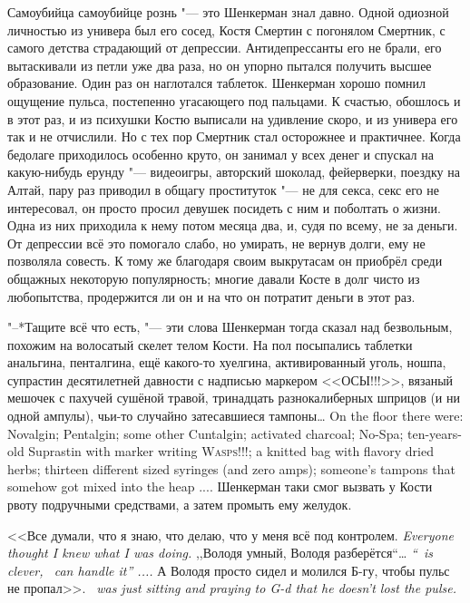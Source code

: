 Самоубийца самоубийце рознь "--- это Шенкерман знал давно.
Одной одиозной личностью из универа был его сосед, Костя Смертин с погонялом Смертник, с самого детства страдающий от депрессии.
Антидепрессанты его не брали, его вытаскивали из петли уже два раза, но он упорно пытался получить высшее образование.
Один раз он наглотался таблеток.
Шенкерман хорошо помнил ощущение пульса, постепенно угасающего под пальцами.
К счастью, обошлось и в этот раз, и из психушки Костю выписали на удивление скоро, и из универа его так и не отчислили.
Но с тех пор Смертник стал осторожнее и практичнее.
Когда бедолаге приходилось особенно круто, он занимал у всех денег и спускал на какую-нибудь ерунду "--- видеоигры, авторский шоколад, фейерверки, поездку на Алтай, пару раз приводил в общагу проституток "--- не для секса, секс его не интересовал, он просто просил девушек посидеть с ним и поболтать о жизни.
Одна из них приходила к нему потом месяца два, и, судя по всему, не за деньги.
От депрессии всё это помогало слабо, но умирать, не вернув долги, ему не позволяла совесть.
К тому же благодаря своим выкрутасам он приобрёл среди общажных некоторую популярность;
многие давали Косте в долг чисто из любопытства, продержится ли он и на что он потратит деньги в этот раз.

"--*Тащите всё что есть, "--- эти слова Шенкерман тогда сказал над безвольным, похожим на волосатый скелет телом Кости.
{На пол посыпались таблетки анальгина, пенталгина, ещё какого-то хуелгина, активированный уголь, ношпа, супрастин десятилетней давности с надписью маркером <<ОСЫ!!!>>, вязаный мешочек с пахучей сушёной травой, тринадцать разнокалиберных шприцов (и ни одной ампулы), чьи-то случайно затесавшиеся тампоны\dots}
{On the floor there were: Novalgin; Pentalgin; some other Cuntalgin; activated charcoal; No-Spa; ten-years-old Suprastin with marker writing \textsc{Wasps!!!}; a knitted bag with flavory dried herbs; thirteen different sized syringes (and zero amps); someone's tampons that somehow got mixed into the heap ....}
Шенкерман таки смог вызвать у Кости рвоту подручными средствами, а затем промыть ему желудок.

{<<Все думали, что я знаю, что делаю, что у меня всё под контролем.}
{\textit{Everyone thought I knew what I was doing.}}
{,,Володя умный, Володя разберётся``\dots}
{\textit{``\Volodya\ is clever, \Volodya\ can handle it'' ....}}
{А Володя просто сидел и молился Б-гу, чтобы пульс не пропал>>.}
{\textit{\Volodya\ was just sitting and praying to G-d that he doesn't lost the pulse.}}

